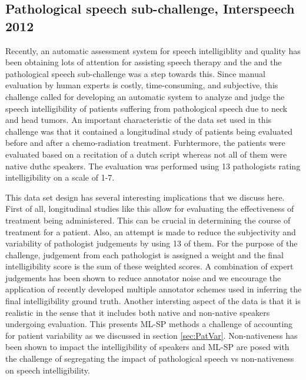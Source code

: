 \documentclass{article}
\begin{document}
\subsection{Pathological speech sub-challenge, Interspeech 2012}
Recently, an automatic assessment system for speech intelligiblity and quality has been obtaining lots of attention for assisting speech therapy and the and the pathological speech sub-challenge was a step towards this.
Since manual evaluation by human experts is costly, time-consuming, and subjective, this challenge called for developing an automatic system to analyze and judge the speech intelligibility of patients suffering from pathological speech due to neck and head tumors.
An important characteristic of the data set used in this challenge was that it contained a longitudinal study of patients being evaluated before and after a chemo-radiation treatment.
Furhtermore, the patients were evaluated based on a recitation of a dutch script whereas not all of them were native duthc speakers. 
The evaluation was performed using 13 pathologists rating intelligibility on a scale of 1-7.

This data set design has several interesting implications that we discuss here.
First of all, longitudinal studies like this allow for evaluating the effectiveness of treatment being administered.
This can be crucial in determining the course of treatment for a patient.
Also, an attempt is made to reduce the subjectivity and variability of pathologist judgements by using 13 of them.
For the purpose of the challenge, judgement from each pathologist is assigned a weight and the final intelligibility score is the sum of these weighted scores.
A combination of expert judgements has been shown to reduce annotator noise \cite{} and we encourage the application of recently developed multiple annotator schemes used in inferring the final intelligibility ground truth. 
Another intersting aspect of the data is that it is realistic in the sense that it includes both native and non-native speakers undergoing evaluation.
This presents ML-SP methods a challenge of accounting for patient variability as we discussed in section \ref{sec:PatVar}.
Non-nativeness has been shown to impact the intelligibility of speakers \cite{van2001intelligibility} and ML-SP are posed with the challenge of segregating the impact of pathological speech vs non-nativeness on speech intelligibility. 
\end{document}
